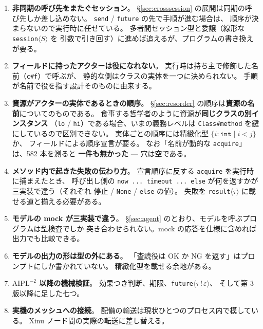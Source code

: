 \documentclass[11pt,a4paper]{ltjsarticle}
\theoremstyle{definition}
\theoremstyle{remark}
\begin{document}
\begin{enumerate}
\item \textbf{非同期の呼び先をまたぐセッション}。
      \S\ref{sec:crosssession} の展開は同期の呼び先しか差し込めない。
      \texttt{send} / \texttt{future} の先で手順が進む場合は、
      順序が決まらないので実行時に任せている。
      多者間セッション型と委譲（線形な \texttt{session}$\langle S\rangle$ を
      引数で引き回す）に進めば追えるが、プログラムの書き換えが要る。
\item \textbf{フィールドに持ったアクターは役になれない}。
      実行時は持ち主で修飾した名前（\texttt{c\#f}）で呼ぶが、
      静的な側はクラスの実体を一つに決められない。
      手順が名前で役を指す設計そのものに由来する。
\item \textbf{資源がアクターの実体であるときの順序}。
      \S\ref{sec:resorder} の順序は\textbf{資源の名前}についてのものである。
      食事する哲学者のように資源が\textbf{同じクラスの別インスタンス}
      （\texttt{lo} / \texttt{hi}）である場合、いまの義務レベルは
      \texttt{Class\#method} を鍵にしているので区別できない。
      実体ごとの順序には精緻化型 $\{i:\mathtt{int} \mid i < j\}$ か、
      フィールドによる順序宣言が要る。
      なお「名前が動的な \texttt{acquire}」は、582 本を測ると
      \textbf{一件も無かった} --- 穴は空である。
\item \textbf{メソッド内で起きた失敗の伝わり方}。
      宣言順序に反する \texttt{acquire} を実行時に捕まえたとき、
      呼び出し側の \texttt{now ... timeout ... else} が何を返すかが
      三実装で違う（それぞれ 停止 / \texttt{None} / \texttt{else} の値）。
      失敗を \texttt{result}$\langle\tau\rangle$ に載せる道と揃える必要がある。
\item \textbf{モデルの mock が三実装で違う}。
      \S\ref{sec:agent} のとおり、モデルを呼ぶプログラムは型検査でしか
      突き合わせられない。mock の応答を仕様に含めれば出力でも比較できる。
\item \textbf{モデルの出力の形は型の外にある}。
      「査読役は OK か NG を返す」はプロンプトにしか書かれていない。
      精緻化型を載せる余地がある。
\item \textbf{$\mathrm{AIPL}^{-2}$ 以降の機械検証}。
      効果つき判断、期限、\texttt{future}$\langle\tau\,!\,\varepsilon\rangle$、
      そして第 3 版以降に足した七つ。
\item \textbf{実機のメッシュへの接続}。
      配備の輸送は現状ひとつのプロセス内で模している。
      Xinu ノード間の実際の転送に差し替える。
\end{enumerate}
\end{document}
